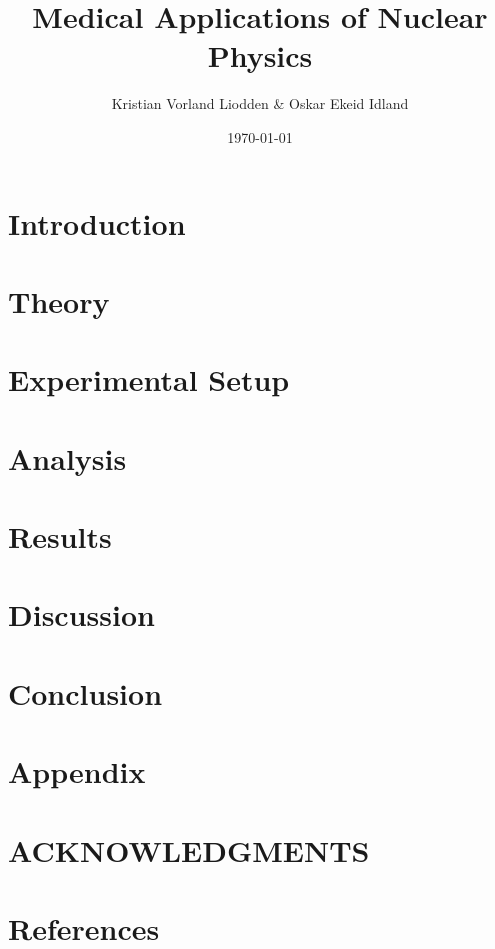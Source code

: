 \documentclass[reprint,english,notitlepage]{revtex4-2}
\begin{document}
\title{Medical Applications of Nuclear Physics}
\author{Kristian Vorland Liodden \& Oskar Ekeid Idland}
\date{\today}

\begin{abstract}
\end{abstract}
\maketitle

\section*{Introduction} \label{sec: introduction}


\section{Theory} \label{sec: theory}


\section{Experimental Setup} \label{sec: Expermintal Setup}


\section{Analysis} \label{sec: analysis}


\section{Results} \label{sec: results}


\section{Discussion} \label{sec: discussion}


\section{Conclusion} \label{sec: conclusion}


\section{Appendix} \label{sec: appendix}

\section*{ACKNOWLEDGMENTS}

\section*{References} \label{sec: references}
\end{document}
